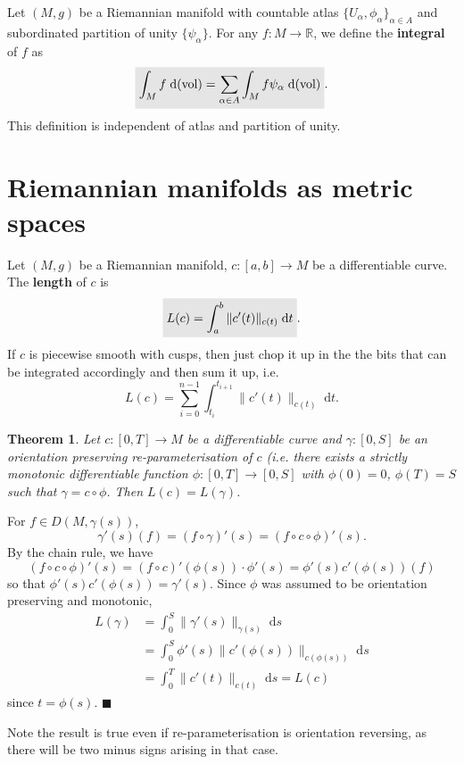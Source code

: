 \documentclass[letter-paper]{tufte-book}
\newtheorem{theorem}{\color{pastel-blue}Theorem}[section]
\newenvironment{proof}[1][Proof]{\begin{trivlist}
\item[\hskip \labelsep {\bfseries #1}]}{\end{trivlist}}
\newcommand{\qed}{\hfill$\blacksquare$}
\newcommand{\highlight}[1]{\mathchoice%
  {\colorbox{black!10}{$\displaystyle#1$}}%
  {\colorbox{black!10}{$\textstyle#1$}}%
  {\colorbox{black!10}{$\scriptstyle#1$}}%
  {\colorbox{black!10}{$\scriptscriptstyle#1$}}}%
\begin{document}
Let $(M,g)$ be a Riemannian manifold with countable atlas $\{U_\alpha, \phi_\alpha\}_{\alpha \in A}$ and subordinated partition of unity $\{\psi_\alpha\}$. For any $f: M\to \mathbb{R}$, we define the \textbf{integral} of $f$ as
\begin{equation}
  \highlight{\int_M f\; \mathrm{d}(\mbox{vol}) = \sum_{\alpha \in A} \int_M f\psi_\alpha\; \mathrm{d}(\mbox{vol})}.
\end{equation}
This definition is independent of atlas and partition of unity.


\section{Riemannian manifolds as metric spaces}

Let $(M,g)$ be a Riemannian manifold, $c:[a,b] \to M$ be a differentiable curve. The \textbf{length} of $c$ is
\begin{equation}
  \highlight{L(c) = \int_a^b \|c'(t)\|_{c(t)}\; \mathrm{d}t}.
\end{equation}
If $c$ is piecewise smooth with cusps, then just chop it up in the the bits that can be integrated accordingly and then sum it up, i.e.
\begin{equation}
  L(c) = \sum_{i=0}^{n-1} \int_{t_i}^{t_{i+1}} \|c'(t)\|_{c(t)}\; \mathrm{d}t.
\end{equation}

\begin{theorem}
  Let $c: [0,T] \to M$ be a differentiable curve and $\gamma : [0, S]$ be an orientation preserving re-parameterisation of $c$ (i.e. there exists a strictly monotonic differentiable function $\phi:[0,T] \to [0,S]$ with $\phi(0)=0$, $\phi(T) = S$ such that $\gamma = c\circ \phi$. Then $L(c) = L(\gamma)$.
\end{theorem}

\begin{proof}
  For $f \in D(M, \gamma(s))$,
  \begin{equation*}
    \gamma'(s)(f) = (f\circ \gamma)'(s) = (f\circ c\circ \phi)'(s).
  \end{equation*}
  By the chain rule, we have
  \begin{equation*}
    (f\circ c\circ \phi)'(s) = (f\circ c)'(\phi(s))\cdot \phi'(s) = \phi'(s)c'(\phi(s))(f)
  \end{equation*}
  so that $\phi'(s) c'(\phi(s)) = \gamma'(s)$. Since $\phi$ was assumed to be orientation preserving and monotonic,
  \begin{align*}
    L(\gamma) 
      &= \int_0^S \|\gamma'(s)\|_{\gamma(s)}\; \mathrm{d}s \\
      &= \int_0^S \phi'(s)\|c'(\phi(s))\|_{c(\phi(s))}\; \mathrm{d}s \\
      &= \int_0^T \|c'(t)\|_{c(t)}\; \mathrm{d}s = L(c)
  \end{align*}
  since $t = \phi(s)$. \qed
\end{proof}
Note the result is true even if re-parameterisation is orientation reversing, as there will be two minus signs arising in that case.
\end{document}
